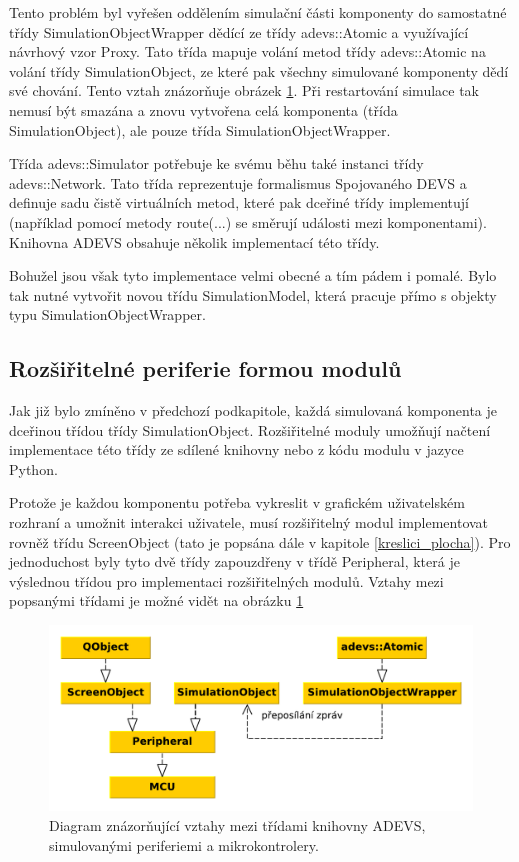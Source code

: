 Tento problém byl vyřešen oddělením simulační části komponenty do samostatné třídy SimulationObjectWrapper dědící ze třídy adevs::Atomic a využívající návrhový vzor Proxy. Tato třída mapuje volání metod třídy adevs::Atomic na volání třídy SimulationObject, ze které pak všechny simulované komponenty dědí
své chování. Tento vztah znázorňuje obrázek \ref{fig:adevs_classes}. Při restartování simulace tak nemusí být smazána a znovu vytvořena celá komponenta (třída SimulationObject), ale pouze třída SimulationObjectWrapper.

Třída adevs::Simulator potřebuje ke svému běhu také instanci třídy adevs::Network. Tato třída reprezentuje formalismus Spojovaného DEVS a definuje sadu čistě virtuálních metod, které pak dceřiné třídy implementují (například pomocí metody route(...) se směrují události mezi komponentami). Knihovna ADEVS obsahuje několik implementací této třídy.

Bohužel jsou však tyto implementace velmi obecné a tím pádem i pomalé. Bylo tak nutné vytvořit novou třídu SimulationModel, která pracuje přímo s objekty typu SimulationObjectWrapper.

\subsection{Rozšiřitelné periferie formou modulů}

Jak již bylo zmíněno v předchozí podkapitole, každá simulovaná komponenta je dceřinou třídou třídy SimulationObject. Rozšiřitelné moduly umožňují načtení implementace této třídy ze sdílené knihovny nebo z kódu modulu v jazyce Python.

Protože je každou komponentu potřeba vykreslit v grafickém uživatelském rozhraní a umožnit interakci uživatele, musí rozšiřitelný modul implementovat rovněž třídu ScreenObject (tato je popsána dále v kapitole \ref{kreslici_plocha}). Pro jednoduchost byly tyto dvě třídy zapouzdřeny v třídě Peripheral, která je výslednou třídou pro implementaci rozšiřitelných modulů. Vztahy mezi popsanými třídami je možné vidět na obrázku \ref{fig:adevs_classes}

\begin{figure}[ht]
\centering
\includegraphics[trim=0cm 0cm 0cm 0cm, scale=0.7]{fig/adevs_class}
\caption{Diagram znázorňující vztahy mezi třídami knihovny ADEVS, simulovanými periferiemi a mikrokontrolery.}
\label{fig:adevs_classes}
\end{figure}

